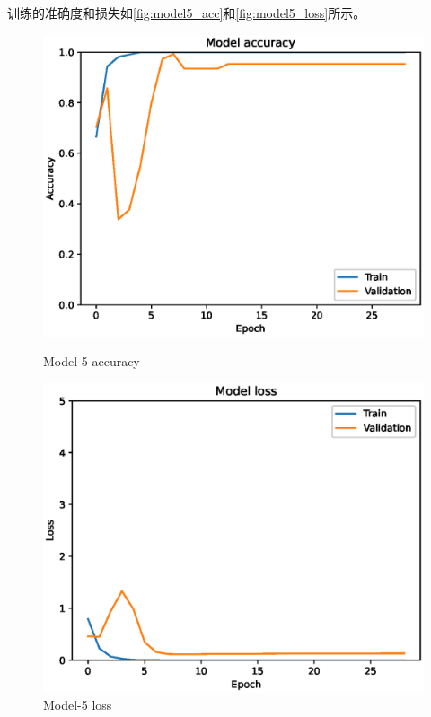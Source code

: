 训练的准确度和损失如\autoref{fig:model5_acc}和\autoref{fig:model5_loss}所示。
\begin{figure}
    \centering
    \begin{minipage}{0.45\textwidth}
        \centering
        \includegraphics[width=\textwidth]{./fig/fish_lung/accuracy5.eps}
        \caption{Model-5 accuracy}
        \label{fig:model5_acc}
    \end{minipage}
    \begin{minipage}{0.45\textwidth}
        \centering
        \includegraphics[width=\textwidth]{./fig/fish_lung/loss5.eps}
        \caption{Model-5 loss}
        \label{fig:model5_loss}
    \end{minipage}
\end{figure}

